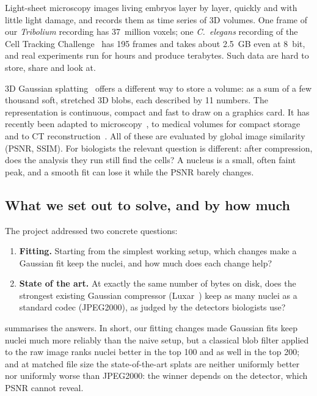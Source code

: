\documentclass[
  paper=a4,
  fontsize=11pt,
  english,
  numbers=noenddot,
  parskip=half,
  cdgeometry=symmetric,
  cd=barcolor,
  cdfont=false
]{tudscrartcl}
\begin{document}
Light-sheet microscopy images living embryos layer by layer, quickly and with little light
damage, and records them as time series of 3D volumes. One frame of our \emph{Tribolium}
recording has 37~million voxels; one \emph{C.~elegans} recording of the Cell Tracking
Challenge~\cite{maska2023cell} has 195 frames and takes about \SI{2.5}{GB} even at 8~bit, and
real experiments run for hours and produce terabytes. Such data are hard to store, share and
look at.

3D Gaussian splatting~\cite{kerbl2023gaussian} offers a different way to store a volume: as a
sum of a few thousand soft, stretched 3D blobs, each described by 11 numbers. The
representation is continuous, compact and fast to draw on a graphics card. It has recently been
adapted to microscopy~\cite{royer2026luxar,gaussianpile2026}, to medical volumes for compact
storage~\cite{gstoken2026,martin2026fixedbudget} and to CT
reconstruction~\cite{zha2024r2gaussian,li2025threedgr}. All of these are evaluated by global
image similarity (PSNR, SSIM). For biologists the relevant question is different: after
compression, does the analysis they run still find the cells? A nucleus is a small, often faint
peak, and a smooth fit can lose it while the PSNR barely changes.

\subsection{What we set out to solve, and by how much}

The project addressed two concrete questions:
\begin{enumerate}
  \item \textbf{Fitting.} Starting from the simplest working setup, which changes make a
        Gaussian fit keep the nuclei, and how much does each change help?
  \item \textbf{State of the art.} At exactly the same number of bytes on disk, does the
        strongest existing Gaussian compressor (Luxar~\cite{royer2026luxar}) keep as many
        nuclei as a standard codec (JPEG2000), as judged by the detectors biologists use?
\end{enumerate}
 summarises the answers. In short, our fitting changes made Gaussian fits
keep nuclei much more reliably than the naive setup, but a classical blob filter applied to the
raw image ranks nuclei better in the top 100 and as well in the top 200; and at matched file size the state-of-the-art splats are
neither uniformly better nor uniformly worse than JPEG2000: the winner depends on the detector,
which PSNR cannot reveal.
\end{document}
